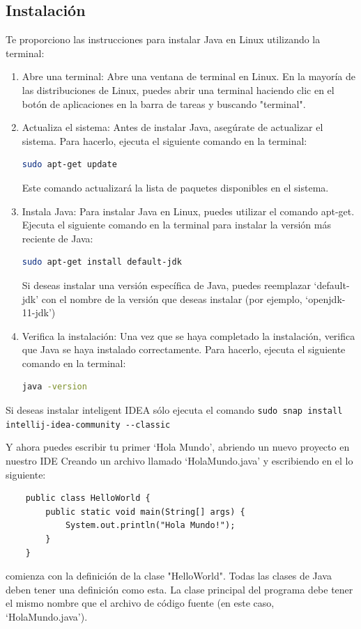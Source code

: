 \documentclass[executivepaper]{article}
\begin{document}
\subsection{Instalación}
Te proporciono las instrucciones para instalar Java en Linux utilizando la terminal:
\begin{enumerate}
    \item Abre una terminal: Abre una ventana de terminal en Linux. En la mayoría de las distribuciones de Linux, puedes abrir una terminal haciendo clic en el botón de aplicaciones en la barra de tareas y buscando "terminal".
    \item Actualiza el sistema: Antes de instalar Java, asegúrate de actualizar el sistema. Para hacerlo, ejecuta el siguiente comando en la terminal:
\begin{lstlisting}[language=Bash]
sudo apt-get update    \end{lstlisting}
        Este comando actualizará la lista de paquetes disponibles en el sistema.
    \item Instala Java: Para instalar Java en Linux, puedes utilizar el comando apt-get. Ejecuta el siguiente comando en la terminal para instalar la versión más reciente de Java:
\begin{lstlisting}[language=Bash]
sudo apt-get install default-jdk\end{lstlisting}
Si deseas instalar una versión específica de Java, puedes reemplazar \enquote*{default-jdk} con el nombre de la versión que deseas instalar (por ejemplo, \enquote*{openjdk-11-jdk})
    \item Verifica la instalación: Una vez que se haya completado la instalación, verifica que Java se haya instalado correctamente. Para hacerlo, ejecuta el siguiente comando en la terminal:
\begin{lstlisting}[language=Bash]
java -version\end{lstlisting}
\end{enumerate}
Si deseas instalar inteligent IDEA sólo ejecuta el comando \lstinline{sudo snap install intellij-idea-community --classic}

Y ahora puedes escribir tu primer \enquote*{Hola Mundo}, abriendo un nuevo proyecto en nuestro IDE Creando un archivo llamado \enquote*{HolaMundo.java} y escribiendo en el lo siguiente:
\begin{lstlisting}
    public class HelloWorld {
        public static void main(String[] args) {
            System.out.println("Hola Mundo!");
        }
    }
\end{lstlisting}
    comienza con la definición de la clase "HelloWorld". Todas las clases de Java deben tener una definición como esta. La clase principal del programa debe tener el mismo nombre que el archivo de código fuente (en este caso, \enquote*{HolaMundo.java}).
\end{document}
